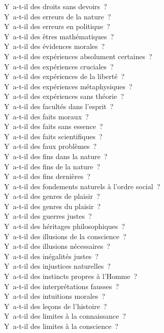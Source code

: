 \documentclass[a4paper,12pt]{article}
\begin{document}
Y a-t-il des droits sans devoirs ? \\
Y a-t-il des erreurs de la nature ? \\
Y a-t-il des erreurs en politique ? \\
Y a-t-il des êtres mathématiques ? \\
Y a-t-il des évidences morales ? \\
Y a-t-il des expériences absolument certaines ? \\
Y a-t-il des expériences cruciales ? \\
Y a-t-il des expériences de la liberté ? \\
Y a-t-il des expériences métaphysiques ? \\
Y a-t-il des expériences sans théorie ? \\
Y a-t-il des facultés dans l'esprit ? \\
Y a-t-il des faits moraux ? \\
Y a-t-il des faits sans essence ? \\
Y a-t-il des faits scientifiques ? \\
Y a-t-il des faux problèmes ? \\
Y a-t-il des fins dans la nature ? \\
Y a-t-il des fins de la nature ? \\
Y a-t-il des fins dernières ? \\
Y a-t-il des fondements naturels à l'ordre social ? \\
Y a-t-il des genres de plaisir ? \\
Y a-t-il des genres du plaisir ? \\
Y a-t-il des guerres justes ? \\
Y a-t-il des héritages philosophiques ? \\
Y a-t-il des illusions de la conscience ? \\
Y a-t-il des illusions nécessaires ? \\
Y a-t-il des inégalités justes ? \\
Y a-t-il des injustices naturelles ? \\
Y a-t-il des instincts propres à l'Homme ? \\
Y a-t-il des interprétations fausses ? \\
Y a-t-il des intuitions morales ? \\
Y a-t-il des leçons de l'histoire ? \\
Y a-t-il des limites à la connaissance ? \\
Y a-t-il des limites à la conscience ? \\
\end{document}
